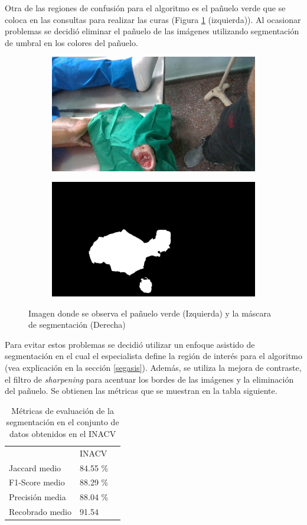 Otra de las regiones de confusión para el algoritmo es el pañuelo verde que se coloca en las consultas para realizar las curas (Figura \ref{fig:tissueMask} (izquierda)). Al ocasionar problemas se decidió eliminar el pañuelo de las imágenes utilizando segmentación de umbral en los colores del pañuelo. 

\begin{figure}
	\centering
	\begin{subfigure}
		\centering
		\includegraphics[width=.4\linewidth]{./Graphics/tissue.jpg}
	\end{subfigure}
	\begin{subfigure}
		\centering
		\includegraphics[width=.4\linewidth]{./Graphics/tissueMask.jpg}
	\end{subfigure}
	\caption{Imagen donde se observa el pañuelo verde (Izquierda) y la máscara de segmentación (Derecha)}
	\label{fig:tissueMask}
\end{figure}

Para evitar estos problemas se decidió utilizar un enfoque asistido de segmentación en el cual el especialista define la región de interés para el algoritmo (vea explicación en la sección \ref{segasis}). Además, se utiliza la mejora de contraste, el filtro de \textit{sharpening} para acentuar los bordes de las imágenes y la eliminación del pañuelo. Se obtienen las métricas que se muestran en la tabla siguiente.

\begin{table}[ht]
	\centering
	\begin{tabular}{lll}
		\hhline{===}
		& INACV\\
		\hhline{===}
		Jaccard medio & 84.55 \% \\ \hline
		F1-Score medio & 88.29 \% \\ \hline
		Precisión media& 88.04 \% \\
		\hline
		Recobrado medio & 91.54 \\
		\hline
	\end{tabular}
	\caption{Métricas de evaluación de la segmentación en el conjunto de datos obtenidos en el INACV}
	\label{tab:metricSegm}
\end{table}


